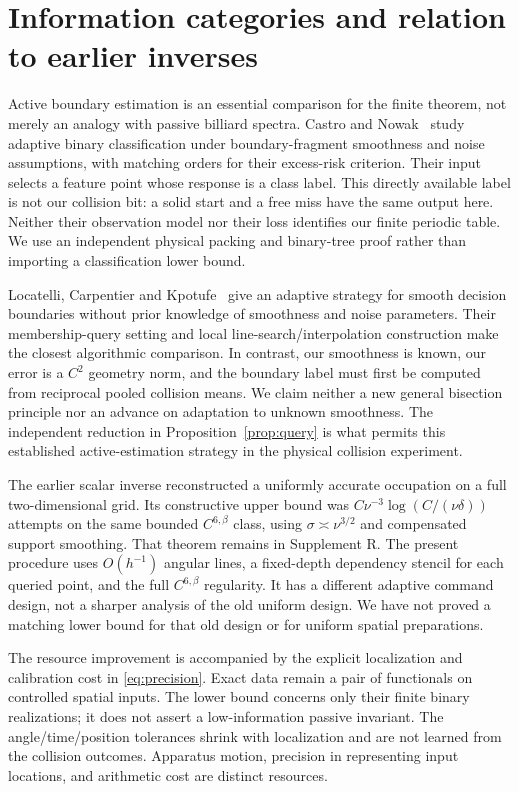 \section{Information categories and relation to earlier inverses}
\label{sec:comparison}
Active boundary estimation is an essential comparison for the finite
theorem, not merely an analogy with passive billiard spectra.
Castro and Nowak~\cite{CN} study adaptive binary classification under
boundary-fragment smoothness and noise assumptions, with matching
orders for their excess-risk criterion. Their input selects a feature
point whose response is a class label. This directly available label
is not our collision bit: a solid start and a free miss have the same
output here. Neither their observation model nor their loss identifies
our finite periodic table. We use an independent physical packing and
binary-tree proof rather than importing a classification lower bound.

Locatelli, Carpentier and Kpotufe~\cite{LCK} give an adaptive strategy
for smooth decision boundaries without prior knowledge of smoothness
and noise parameters. Their membership-query setting and local
line-search/interpolation construction make the closest algorithmic
comparison. In contrast, our smoothness is known, our error is a $C^2$
geometry norm, and the boundary label must first be computed from
reciprocal pooled collision means. We claim neither a new general
bisection principle nor an advance on adaptation to unknown smoothness.
The independent reduction in Proposition~\ref{prop:query} is what
permits this established active-estimation strategy in the physical
collision experiment.

The earlier scalar inverse reconstructed a uniformly accurate occupation
on a full two-dimensional grid. Its constructive upper bound was
$C\nu^{-3}\log(C/(\nu\delta))$ attempts on the same bounded
$C^{6,\beta}$ class, using $\sigma\asymp\nu^{3/2}$ and compensated
support smoothing. That theorem remains in Supplement R. The present
procedure uses $O(h^{-1})$ angular lines, a fixed-depth dependency
stencil for each queried point, and the full $C^{6,\beta}$ regularity.
It has a different adaptive command design, not a sharper analysis of
the old uniform design. We have not proved a matching lower bound
for that old design or for uniform spatial preparations.

The resource improvement is accompanied by the explicit localization
and calibration cost in \eqref{eq:precision}. Exact data remain a pair
of functionals on controlled spatial inputs. The lower bound concerns
only their finite binary realizations; it does not assert a low-information
passive invariant. The angle/time/position tolerances shrink with
localization and are not learned from the collision outcomes. Apparatus
motion, precision in representing input locations, and arithmetic
cost are distinct resources.

